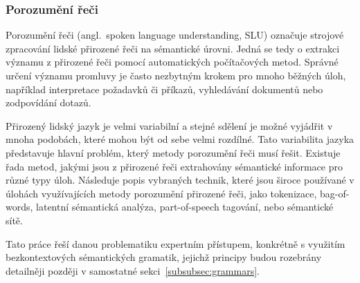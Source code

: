 \subsubsection{Porozumění řeči}
Porozumění řeči (angl.~spoken language understanding, SLU) označuje strojové zpracování lidské přirozené řeči na sémantické úrovni.
Jedná se tedy o extrakci významu z přirozené řeči pomocí automatických počítačových metod.
Správné určení významu promluvy je často nezbytným krokem pro mnoho běžných úloh, například interpretace požadavků či příkazů,
vyhledávání dokumentů nebo zodpovídání dotazů.~\cite{the_conversational_interface}

Přirozený lidský jazyk je velmi variabilní a stejné sdělení je možné vyjádřit v mnoha podobách, které mohou být od sebe velmi rozdílné.
Tato variabilita jazyka představuje hlavní problém, který metody porozumění řeči musí řešit.
Existuje řada metod, jakými jsou z přirozené řeči extrahovány sémantické informace pro různé typy úloh.
Následuje popis vybraných technik, které jsou široce používané v úlohách využívajících
metody porozumění přirozené řeči, jako tokenizace, bag-of-words, latentní sémantická analýza, part-of-speech tagování, nebo sémantické sítě.~\cite{the_conversational_interface}

Tato práce řeší danou problematiku expertním přístupem, konkrétně s využitím bezkontextových sémantických gramatik,
jejichž principy budou rozebrány detailněji později v samostatné sekci~\ref{subsubsec:grammars}.

